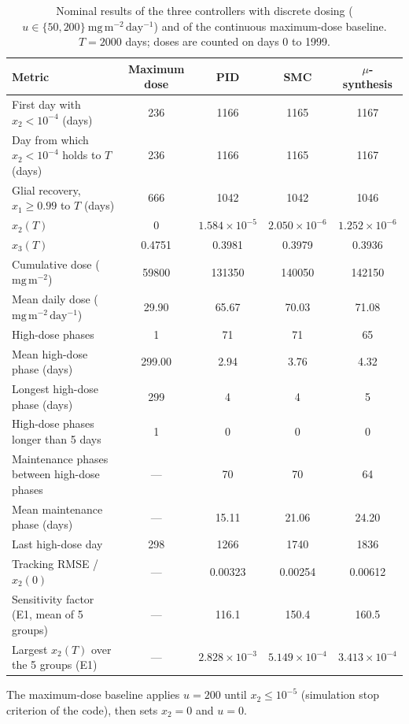 \begin{table}[htbp]
\centering
\caption{Nominal results of the three controllers with discrete dosing ($u\in\{50,200\}~\mathrm{mg\,m^{-2}\,day^{-1}}$) and of the continuous maximum-dose baseline. $T=2000$ days; doses are counted on days 0 to 1999.}
\label{tab:controller_summary_final}
\small
\begin{tabular}{lcccc}
\toprule
Metric & Maximum dose & PID & SMC & $\mu$-synthesis \\
\midrule
First day with $x_2<10^{-4}$ (days) & 236 & 1166 & 1165 & 1167 \\
Day from which $x_2<10^{-4}$ holds to $T$ (days) & 236 & 1166 & 1165 & 1167 \\
Glial recovery, $x_1\ge 0.99$ to $T$ (days) & 666 & 1042 & 1042 & 1046 \\
$x_2(T)$ & $0$ & $1.584{\times}10^{-5}$ & $2.050{\times}10^{-6}$ & $1.252{\times}10^{-6}$ \\
$x_3(T)$ & 0.4751 & 0.3981 & 0.3979 & 0.3936 \\
Cumulative dose ($\mathrm{mg\,m^{-2}}$) & 59800 & 131350 & 140050 & 142150 \\
Mean daily dose ($\mathrm{mg\,m^{-2}\,day^{-1}}$) & 29.90 & 65.67 & 70.03 & 71.08 \\
High-dose phases & 1 & 71 & 71 & 65 \\
Mean high-dose phase (days) & 299.00 & 2.94 & 3.76 & 4.32 \\
Longest high-dose phase (days) & 299 & 4 & 4 & 5 \\
High-dose phases longer than 5 days & 1 & 0 & 0 & 0 \\
Maintenance phases between high-dose phases & --- & 70 & 70 & 64 \\
Mean maintenance phase (days) & --- & 15.11 & 21.06 & 24.20 \\
Last high-dose day & 298 & 1266 & 1740 & 1836 \\
Tracking RMSE / $x_2(0)$ & --- & 0.00323 & 0.00254 & 0.00612 \\
Sensitivity factor (E1, mean of 5 groups) & --- & 116.1 & 150.4 & 160.5 \\
Largest $x_2(T)$ over the 5 groups (E1) & --- & $2.828{\times}10^{-3}$ & $5.149{\times}10^{-4}$ & $3.413{\times}10^{-4}$ \\
\bottomrule
\end{tabular}
\par\smallskip\footnotesize The maximum-dose baseline applies $u=200$ until $x_2\le10^{-5}$ (simulation stop criterion of the code), then sets $x_2=0$ and $u=0$.
\end{table}
